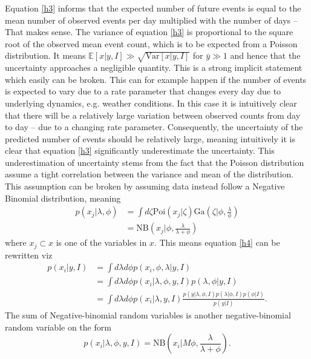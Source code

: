 Equation \eqref{h3} informs that the expected number of future events is equal to the mean number of observed events per day multiplied with the number of days -- That makes sense. The variance of equation \eqref{h3} is proportional to the square root of the observed mean event count, which is to be expected from a Poisson distribution. It means $\mathbb{E}[x|y,I]\gg \sqrt{\text{Var}[x|y,I]}$ for $\bar{y}\gg 1$ and hence that the uncertainty approaches a negligible quantity. This is a strong implicit statement which easily can be broken. This can for example happen if the number of events is expected to vary due to a rate parameter that changes every day due to underlying dynamics, e.g. weather conditions. In this case it is intuitively clear that there will be a relatively large variation between observed counts from day to day -- due to a changing rate parameter. Consequently, the uncertainty of the predicted number of events should be relatively large, meaning intuitively it is clear that equation \eqref{h3} significantly underestimate the uncertainty. This underestimation of uncertainty stems from the fact that the Poisson distribution assume a tight correlation between the variance and mean of the distribution. This assumption can be broken by assuming data instead follow a Negative Binomial distribution, meaning
\begin{equation}
	\begin{split}
		p(x_j|\lambda,\phi) &= \int d\zeta  \text{Poi}(x_j|\zeta)\text{Ga}(\zeta|\phi,\frac{\lambda}{\phi})\\
		&=\text{NB}(x_j|\phi,\frac{\lambda}{\lambda+\phi})
	\end{split}
\end{equation}
where $x_j\subset x$ is one of the variables in $x$. This means equation \eqref{h4} can be rewritten viz
\begin{equation}
	\begin{split}
		p(x_i|y,I) &= \int d\lambda d\phi p(x_i,\phi,\lambda|y,I)\\
		&=\int d\lambda d\phi p(x_i|\lambda,\phi,y,I)p(\lambda,\phi|y,I)\\
		&= \int d\lambda d\phi p(x_i|\lambda,y,I)\frac{p(y|\lambda,\phi,I)p(\lambda|\phi,I)p(\phi|I)}{p(y|I)}.
	\end{split}
	\label{h5}
\end{equation}
The sum of Negative-binomial random variables is another negative-binomial random variable on the form
\begin{equation}
	p(x_i|\lambda,\phi,y,I) = \text{NB}(x_i|M\phi,\frac{\lambda}{\lambda+\phi}).
\end{equation}
